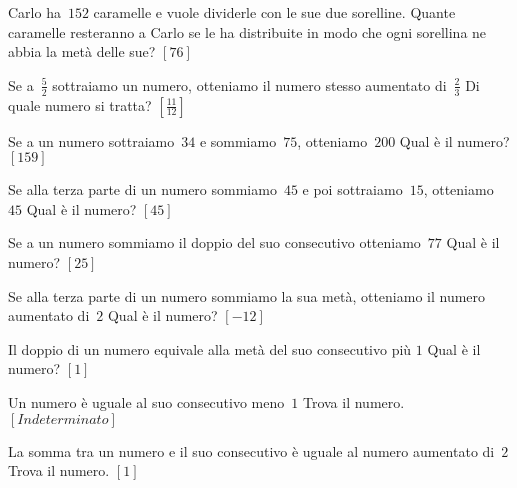 \begin{htmulticols}{2}
\begin{esercizio}[*]
\label{ese:14.9}
Carlo ha~\(152\) caramelle e vuole dividerle con le sue due sorelline. Quante 
caramelle resteranno a Carlo se le ha distribuite in modo che ogni sorellina ne 
abbia la metà delle sue? \hfill \(\left[76\right]\)
\end{esercizio}

\begin{esercizio}[*]
\label{ese:14.10}
Se a~\(\frac{5}{2}\) sottraiamo un numero, otteniamo il numero stesso aumentato 
di~\(\frac{2}{3}\) Di quale numero si tratta? \hfill 
\(\left[\frac{11}{12}\right]\)
\end{esercizio}

\begin{esercizio}[*]
\label{ese:14.11}
Se a un numero sottraiamo~\(34\) e sommiamo~\(75\), otteniamo~\(200\) Qual è il 
numero? \hfill \(\left[159\right]\)
\end{esercizio}

\begin{esercizio}[*]
\label{ese:14.12}
Se alla terza parte di un numero sommiamo~\(45\) e poi sottraiamo~\(15\), 
otteniamo~\(45\) Qual è il numero? \hfill \(\left[45\right]\)
\end{esercizio}

\begin{esercizio}[*]
\label{ese:14.13}
Se a un numero sommiamo il doppio del suo consecutivo otteniamo~\(77\) Qual è 
il 
numero? \hfill \(\left[25\right]\)
\end{esercizio}

\begin{esercizio}[*]
\label{ese:14.14}
Se alla terza parte di un numero sommiamo la sua metà, otteniamo il numero 
aumentato di~\(2\) Qual è il numero? \hfill \(\left[-12\right]\)
\end{esercizio}

\begin{esercizio}[*]
\label{ese:14.15}
Il doppio di un numero equivale alla metà del suo consecutivo più \(1\) Qual è 
il 
numero? \hfill \(\left[1\right]\)
\end{esercizio}

\begin{esercizio}[*]
\label{ese:14.16}
Un numero è uguale al suo consecutivo meno~\(1\) Trova il numero. 
\hfill \(\left[Indeterminato\right]\)
\end{esercizio}

\begin{esercizio}[*]
\label{ese:14.17}
La somma tra un numero e il suo consecutivo è uguale al numero aumentato 
di~\(2\) 
Trova il numero. \hfill \(\left[1\right]\)
\end{esercizio}


\end{htmulticols}
